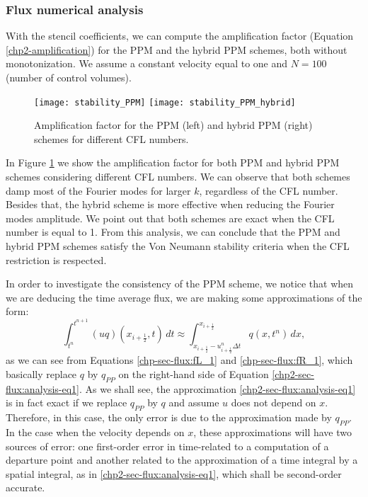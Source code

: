 \subsubsection{Flux numerical analysis}
With the stencil coefficients, we can compute the amplification factor 
(Equation \eqref{chp2-amplification}) for the PPM and the hybrid PPM schemes, both without monotonization.
We assume a constant velocity equal to one and $N=100$ (number of control volumes).
\begin{figure}[ht]
	\centering
	\texttt{[image: stability\_PPM]}
	\texttt{[image: stability\_PPM\_hybrid]}
	\caption{Amplification factor for the PPM (left) and hybrid PPM (right) schemes for different CFL numbers.}
	\label{chp2-fig-amplification}
\end{figure}
In Figure \ref{chp2-fig-amplification} we show the amplification factor for both PPM and hybrid PPM schemes
considering different CFL numbers.
We can observe that both schemes damp most of the Fourier modes for larger $k$, regardless of the CFL number.
Besides that, the hybrid scheme is more effective when reducing the Fourier modes amplitude.
We point out that both schemes are exact when the CFL number is equal to 1.
From this analysis, we can conclude that the PPM and hybrid PPM schemes satisfy the
Von Neumann stability criteria when the CFL restriction is respected.

In order to investigate the consistency of the PPM scheme, we notice that when we are deducing the time average flux, 
we are making some approximations of the form:
\begin{equation}
	\label{chp2-sec-flux:analysis-eq1}
	\int_{t^n}^{t^{n+1}} (uq)(x_{i+\frac{1}{2}},t) \,dt \approx
  \int_{x_{i+\frac{1}{2}}-u_{i+\frac{1}{2}}^n \Delta t}^{x_{i+\frac{1}{2}}}
	q(x,t^n)\,dx, 
\end{equation}
as we can see from Equations \eqref{chp-sec-flux:fL_1} and \eqref{chp-sec-flux:fR_1},
which basically replace $q$ by $q_{PP}$ on the right-hand side of Equation
\eqref{chp2-sec-flux:analysis-eq1}.
As we shall see, the approximation \eqref{chp2-sec-flux:analysis-eq1}
is in fact exact if we replace $q_{PP}$ by $q$ and assume $u$ does not depend on $x$.
Therefore, in this case, the only error is due to the approximation made by $q_{PP}$. 
In the case when the velocity depends on $x$, these approximations will have two sources
of error: one first-order error in time-related to a computation of a departure point and
another related to the approximation of a time integral by a spatial integral, 
as in \eqref{chp2-sec-flux:analysis-eq1}, which shall be second-order accurate.

